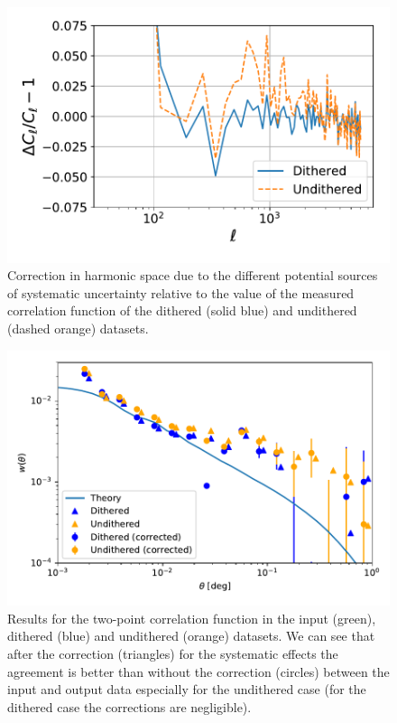 \documentclass[\docopts]{\docclass}
\begin{document}
\begin{figure}
\centering
\includegraphics[width=0.9\columnwidth]{Cl_25p3_sys_comparison}
\caption{Correction in harmonic space due to the different potential sources of systematic uncertainty relative to the value of the measured correlation function of the dithered (solid blue) and undithered (dashed orange) datasets.}
\label{fig:sys_harmonic_space}
\end{figure}

\begin{figure}
\centering
\includegraphics[width=0.9\columnwidth]{w_comp_corr25p3.pdf}
\caption{Results for the two-point correlation function in the input (green), dithered (blue) and undithered (orange) datasets. We can see that after the correction (triangles) for the systematic effects the agreement is better than without the correction (circles) between the input and output data especially for the undithered case (for the dithered case the corrections are negligible).} 
\label{fig:2pt_corr}
\end{figure}
\end{document}
